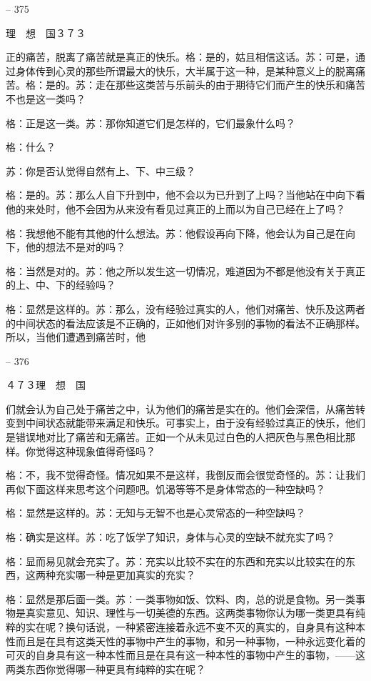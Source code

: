 \documentclass[11pt,oneside]{book}
\begin{document}
\begin{common-format}
    

-- 375

    理　想　国３７３

    正的痛苦，脱离了痛苦就是真正的快乐。格：是的，姑且相信这话。苏：可是，通过身体传到心灵的那些所谓最大的快乐，大半属于这一种，是某种意义上的脱离痛苦。格：是的。苏：走在那些这类苦与乐前头的由于期待它们而产生的快乐和痛苦不也是这一类吗？

    格：正是这一类。苏：那你知道它们是怎样的，它们最象什么吗？

    格：什么？

    苏：你是否认觉得自然有上、下、中三级？

    格：是的。苏：那么人自下升到中，他不会以为已升到了上吗？当他站在中向下看他的来处时，他不会因为从来没有看见过真正的上而以为自己已经在上了吗？

    格：我想他不能有其他的什么想法。苏：他假设再向下降，他会认为自己是在向下，他的想法不是对的吗？

    格：当然是对的。苏：他之所以发生这一切情况，难道因为不都是他没有关于真正的上、中、下的经验吗？

    格：显然是这样的。苏：那么，没有经验过真实的人，他们对痛苦、快乐及这两者的中间状态的看法应该是不正确的，正如他们对许多别的事物的看法不正确那样。所以，当他们遭遇到痛苦时，他

    

-- 376

    ４７３理　想　国

    们就会认为自己处于痛苦之中，认为他们的痛苦是实在的。他们会深信，从痛苦转变到中间状态就能带来满足和快乐。可事实上，由于没有经验过真正的快乐，他们是错误地对比了痛苦和无痛苦。正如一个从未见过白色的人把灰色与黑色相比那样。你觉得这种现象值得奇怪吗？

    格：不，我不觉得奇怪。情况如果不是这样，我倒反而会很觉奇怪的。苏：让我们再似下面这样来思考这个问题吧。饥渴等等不是身体常态的一种空缺吗？

    格：显然是这样的。苏：无知与无智不也是心灵常态的一种空缺吗？

    格：确实是这样。苏：吃了饭学了知识，身体与心灵的空缺不就充实了吗？

    格：显而易见就会充实了。苏：充实以比较不实在的东西和充实以比较实在的东西，这两种充实哪一种是更加真实的充实？

    格：显然是那后面一类。苏：一类事物如饭、饮料、肉，总的说是食物。另一类事物是真实意见、知识、理性与一切美德的东西。这两类事物你认为哪一类更具有纯粹的实在呢？换句话说，一种紧密连接着永远不变不灭的真实的，自身具有这种本性而且是在具有这类天性的事物中产生的事物，和另一种事物，一种永远变化着的可灭的自身具有这一种本性而且是在具有这一种本性的事物中产生的事物，——这两类东西你觉得哪一种更具有纯粹的实在呢？


\end{common-format}
\end{document}
